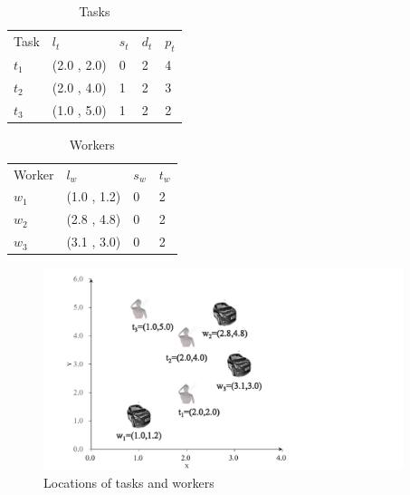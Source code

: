 \documentclass[color,twoside,amssymb,twocolumn]{article}
\begin{document}
\doublerulesep 0.1pt
\begin{table}[h]
	\begin{footnotesize}
		\caption{Tasks}
		\label{tab:1}
		\begin{tabular}{p{1cm}p{2cm}p{1cm}p{1cm}p{1cm}}
			\hline\hline\noalign{\smallskip}
			Task & $l_t$ & $s_t$ & $d_t$ & $p_t$ \\
			\noalign{\smallskip}
			\hline
			$t_1$ & (2.0 , 2.0) & 0 & 2 & 4 \\
			$t_2$ & (2.0 , 4.0) & 1 & 2 & 3 \\  
			$t_3$ & (1.0 , 5.0) & 1 & 2 & 2 \\
			\hline\hline
		\end{tabular}
	\end{footnotesize}
\end{table}


\doublerulesep 0.1pt
\begin{table}[h]
	\begin{footnotesize}
		\caption{Workers}
		\label{tab:1}
		\begin{tabular}{p{1cm}p{2cm}p{1.75cm}p{1.75cm}}
			\hline\hline\noalign{\smallskip}
			Worker & $l_w$ & $s_w$ & $t_w$ \\
			\noalign{\smallskip}
			\hline
			$w_1$ & (1.0 , 1.2) & 0 & 2 \\  
			$w_2$ & (2.8 , 4.8) & 0 & 2 \\         
			$w_3$ & (3.1 , 3.0) & 0 & 2 \\
			\hline\hline
		\end{tabular}
	\end{footnotesize}
\end{table}


\begin{figure}[h]
	\centering
	\includegraphics[width=10.5cm]{ex1.pdf}
	\caption{Locations of tasks and workers}
	\label{fig:insert}
\end{figure}
\end{document}
